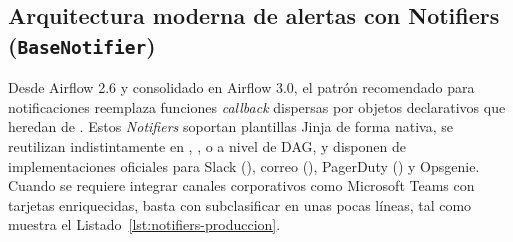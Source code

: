 \subsection{Arquitectura moderna de alertas con Notifiers (\texttt{BaseNotifier})}

Desde Airflow 2.6 y consolidado en Airflow 3.0, el patrón recomendado para notificaciones reemplaza funciones \textit{callback} dispersas por objetos declarativos que heredan de . Estos \textit{Notifiers} soportan plantillas Jinja de forma nativa, se reutilizan indistintamente en , ,  o a nivel de DAG, y disponen de implementaciones oficiales para Slack (), correo (), PagerDuty () y Opsgenie. Cuando se requiere integrar canales corporativos como Microsoft Teams con tarjetas enriquecidas, basta con subclasificar  en unas pocas líneas, tal como muestra el Listado~\ref{lst:notifiers-produccion}.

